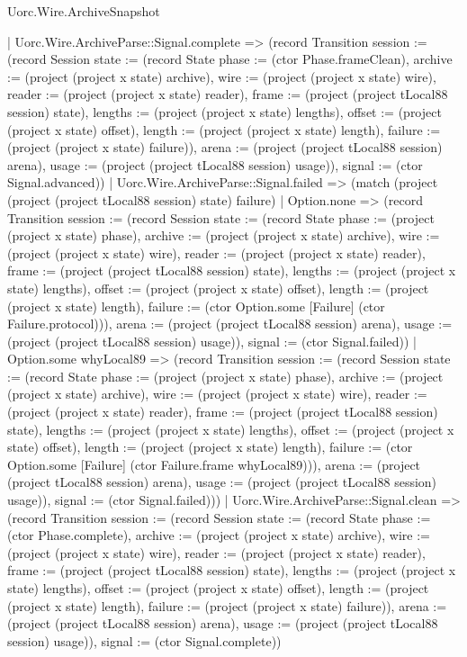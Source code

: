 \begin{lexlean}{Uorc.Wire.ArchiveSnapshot}
\begin{semanticmodule}
{        | Uorc.Wire.ArchiveParse::Signal.complete => (record Transition {session := (record Session {state := (record State {phase := (ctor Phase.frameClean), archive := (project (project x state) archive), wire := (project (project x state) wire), reader := (project (project x state) reader), frame := (project (project tLocal88 session) state), lengths := (project (project x state) lengths), offset := (project (project x state) offset), length := (project (project x state) length), failure := (project (project x state) failure)}), arena := (project (project tLocal88 session) arena), usage := (project (project tLocal88 session) usage)}), signal := (ctor Signal.advanced)})
        | Uorc.Wire.ArchiveParse::Signal.failed => (match (project (project (project tLocal88 session) state) failure)
          | Option.none => (record Transition {session := (record Session {state := (record State {phase := (project (project x state) phase), archive := (project (project x state) archive), wire := (project (project x state) wire), reader := (project (project x state) reader), frame := (project (project tLocal88 session) state), lengths := (project (project x state) lengths), offset := (project (project x state) offset), length := (project (project x state) length), failure := (ctor Option.some [Failure] (ctor Failure.protocol))}), arena := (project (project tLocal88 session) arena), usage := (project (project tLocal88 session) usage)}), signal := (ctor Signal.failed)})
          | Option.some whyLocal89 => (record Transition {session := (record Session {state := (record State {phase := (project (project x state) phase), archive := (project (project x state) archive), wire := (project (project x state) wire), reader := (project (project x state) reader), frame := (project (project tLocal88 session) state), lengths := (project (project x state) lengths), offset := (project (project x state) offset), length := (project (project x state) length), failure := (ctor Option.some [Failure] (ctor Failure.frame whyLocal89))}), arena := (project (project tLocal88 session) arena), usage := (project (project tLocal88 session) usage)}), signal := (ctor Signal.failed)}))
        | Uorc.Wire.ArchiveParse::Signal.clean => (record Transition {session := (record Session {state := (record State {phase := (ctor Phase.complete), archive := (project (project x state) archive), wire := (project (project x state) wire), reader := (project (project x state) reader), frame := (project (project tLocal88 session) state), lengths := (project (project x state) lengths), offset := (project (project x state) offset), length := (project (project x state) length), failure := (project (project x state) failure)}), arena := (project (project tLocal88 session) arena), usage := (project (project tLocal88 session) usage)}), signal := (ctor Signal.complete)})
}
\end{semanticmodule}
\end{lexlean}

